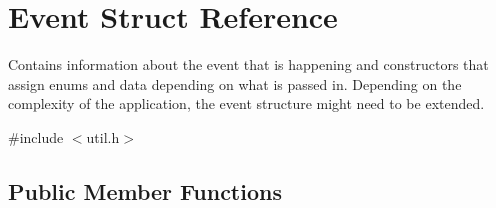 \hypertarget{structEvent}{}\section{Event Struct Reference}
\label{structEvent}


Contains information about the event that is happening and constructors that assign enums and data depending on what is passed in. Depending on the complexity of the application, the event structure might need to be extended.  




{\ttfamily \#include $<$util.\+h$>$}

\subsection*{Public Member Functions}
